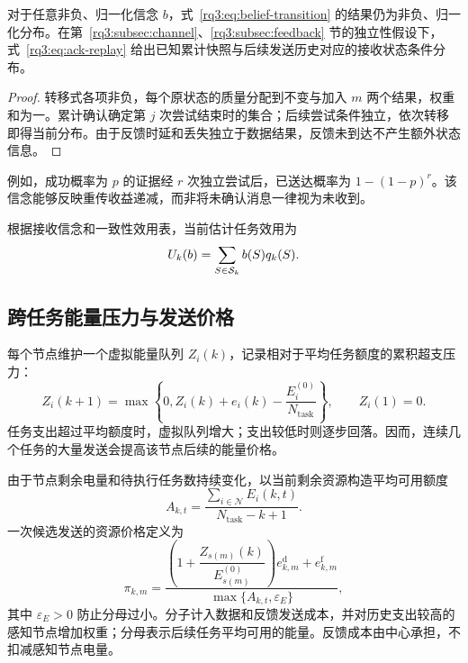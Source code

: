 \begin{proposition}[接收信念的有效性]
\label{rq3:prop:belief}
对于任意非负、归一化信念 $b$，式~\eqref{rq3:eq:belief-transition} 的结果仍为非负、归一化分布。在第~\ref{rq3:subsec:channel}、\ref{rq3:subsec:feedback} 节的独立性假设下，式~\eqref{rq3:eq:ack-replay} 给出已知累计快照与后续发送历史对应的接收状态条件分布。
\end{proposition}

\begin{proof}
转移式各项非负，每个原状态的质量分配到不变与加入 $m$ 两个结果，权重和为一。累计确认确定第 $j$ 次尝试结束时的集合；后续尝试条件独立，依次转移即得当前分布。由于反馈时延和丢失独立于数据结果，反馈未到达不产生额外状态信息。
\end{proof}

例如，成功概率为 $p$ 的证据经 $r$ 次独立尝试后，已送达概率为 $1-(1-p)^r$。该信念能够反映重传收益递减，而非将未确认消息一律视为未收到。

根据接收信念和一致性效用表，当前估计任务效用为
\begin{equation}
  U_k(b)=\sum_{S\in\mathcal{S}_k}b(S)q_k(S).
  \label{rq3:eq:expected-utility}
\end{equation}

\subsection{跨任务能量压力与发送价格}
\label{rq3:subsec:queue}

每个节点维护一个虚拟能量队列 $Z_i(k)$，记录相对于平均任务额度的累积超支压力：
\begin{equation}
  Z_i(k+1)=\max\left\{0,Z_i(k)+e_i(k)-\frac{E_i^{(0)}}{N_{\mathrm{task}}}\right\},
  \qquad Z_i(1)=0.
  \label{rq3:eq:virtual-queue}
\end{equation}
任务支出超过平均额度时，虚拟队列增大；支出较低时则逐步回落。因而，连续几个任务的大量发送会提高该节点后续的能量价格。

由于节点剩余电量和待执行任务数持续变化，以当前剩余资源构造平均可用额度
\begin{equation}
  A_{k,t}=\frac{\sum_{i\in\mathcal{N}}E_i(k,t)}{N_{\mathrm{task}}-k+1}.
  \label{rq3:eq:remaining-allowance}
\end{equation}
一次候选发送的资源价格定义为
\begin{equation}
  \pi_{k,m}=\frac{
      \left(1+\dfrac{Z_{s(m)}(k)}{E_{s(m)}^{(0)}}\right)e_{k,m}^{\mathrm d}
      +e_{k,m}^{\mathrm f}}
      {\max\{A_{k,t},\varepsilon_E\}},
  \label{rq3:eq:resource-price}
\end{equation}
其中 $\varepsilon_E>0$ 防止分母过小。分子计入数据和反馈发送成本，并对历史支出较高的感知节点增加权重；分母表示后续任务平均可用的能量。反馈成本由中心承担，不扣减感知节点电量。


